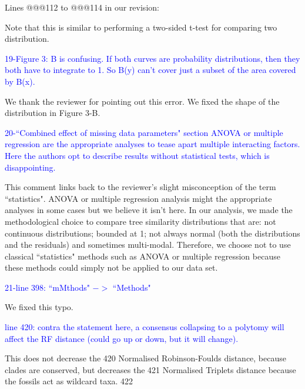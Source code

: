 \documentclass[11pt]{letter}
\begin{document}
\begin{letter}{}
Lines @@@112 to @@@114 in our revision:

\hfill\begin{minipage}{\dimexpr\textwidth-1cm}
Note that this is similar to performing a two-sided t-test for comparing two distribution.
\end{minipage}


\textcolor{blue}{19-Figure 3: B is confusing. If both curves are probability distributions, then they both have to integrate to 1. So B(y) can't cover just a subset of the area covered by B(x).}

We thank the reviewer for pointing out this error. We fixed the shape of the distribution in Figure 3-B.


\textcolor{blue}{20-``Combined effect of missing data parameters" section ANOVA or multiple regression are the appropriate analyses to tease apart multiple interacting factors. Here the authors opt to describe results without statistical tests, which is disappointing.}

This comment links back to the reviewer's slight misconception of the term ``statistics". ANOVA or multiple regression analysis might the appropriate analyses in some cases but we believe it isn't here. In our analysis, we made the methodological choice to compare tree similarity distributions that are: not continuous distributions; bounded at 1; not always normal (both the distributions and the residuals) and sometimes multi-modal. Therefore, we choose not to use classical ``statistics" methods such as ANOVA or multiple regression because these methods could simply not be applied to our data set.



\textcolor{blue}{21-line 398: ``mMthods" $->$ ``Methods"}

We fixed this typo.

\textcolor{blue}{line 420: contra the statement here, a consensus collapsing to a polytomy will affect the RF distance (could go up or down, but it will change).}


This does not decrease the 420
Normalised Robinson-Foulds distance, because clades are conserved, but decreases the 421
Normalised Triplets distance because the fossils act as wildcard taxa. 422



\end{letter}
\end{document}
